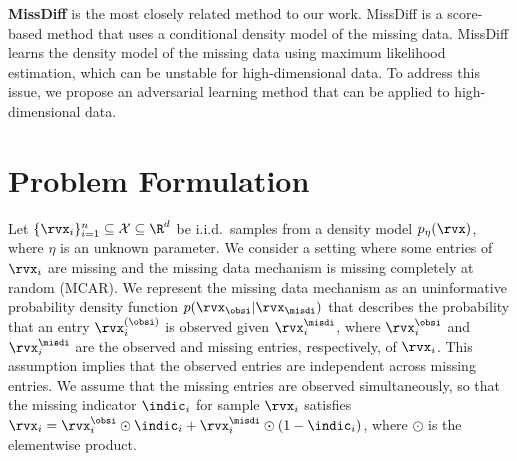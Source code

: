 \documentclass{article} %
\begin{document}
\textbf{MissDiff} \citep{Ouyang2023} is the most closely related method to our work. MissDiff is a score-based method that uses a conditional density model of the missing data. MissDiff learns the density model of the missing data using maximum likelihood estimation, which can be unstable for high-dimensional data. To address this issue, we propose an adversarial learning method that can be applied to high-dimensional data.



\section{Problem Formulation}

\label{sec:problem}
Let $\{ \rvx_{i} \}_{i=1}^{n} \subseteq \mathcal{X} \subseteq \R^{d}$ be i.i.d.\ samples from a density model $p_{\eta}(\rvx)$, where $\eta$ is an unknown parameter. 
We consider a setting where some entries of $\rvx_{i}$ are missing and the missing data mechanism is missing completely at random (MCAR). 
We represent the missing data mechanism as an uninformative probability density function $p(\rvx_{\obsi} | \rvx_{\misdi})$ that describes the probability that an entry $\rvx_{i}^{(\obsi)}$ is observed given $\rvx_{i}^{\misdi}$, where $\rvx_{i}^{\obsi}$ and $\rvx_{i}^{\misdi}$ are the observed and missing entries, respectively, of $\rvx_{i}$. This assumption implies that the observed entries are independent across missing entries. We assume that the missing entries are observed simultaneously, so that the missing indicator $\indic_{i}$ for sample $\rvx_{i}$ satisfies $\rvx_{i} = \rvx_{i}^{\obsi} \odot \indic_{i}+ \rvx_{i}^{\misdi} \odot (1-\indic_{i})$, where $\odot$ is the elementwise product.
\end{document}
